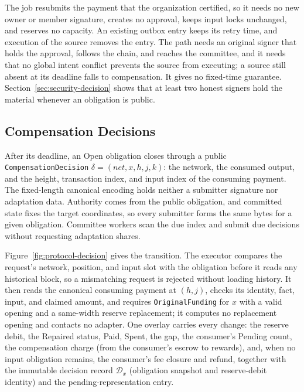 The job resubmits the payment that the organization certified, so it needs no new owner or member signature, creates no approval, keeps input locks unchanged, and reserves no capacity. An existing outbox entry keeps its retry time, and execution of the source removes the entry. The path needs an original signer that holds the approval, follows the chain, and reaches the committee, and it needs that no global intent conflict prevents the source from executing; a source still absent at its deadline falls to compensation. It gives no fixed-time guarantee. Section~\ref{sec:security-decision} shows that at least two honest signers hold the material whenever an obligation is public.

\subsection{Compensation Decisions}
\label{sec:protocol-decision}

After its deadline, an Open obligation closes through a public \texttt{CompensationDecision} $\delta=(\mathit{net},x,h,j,k)$: the network, the consumed output, and the height, transaction index, and input index of the consuming payment. The fixed-length canonical encoding holds neither a submitter signature nor adaptation data. Authority comes from the public obligation, and committed state fixes the target coordinates, so every submitter forms the same bytes for a given obligation. Committee workers scan the due index and submit due decisions without requesting adaptation shares.

Figure~\ref{fig:protocol-decision} gives the transition. The executor compares the request's network, position, and input slot with the obligation before it reads any historical block, so a mismatching request is rejected without loading history. It then reads the canonical consuming payment at $(h,j)$, checks its identity, fact, input, and claimed amount, and requires \texttt{OriginalFunding} for $x$ with a valid opening and a same-width reserve replacement; it computes no replacement opening and contacts no adapter. One overlay carries every change: the reserve debit, the Repaired status, Paid, Spent, the gap, the consumer's Pending count, the compensation charge (from the consumer's escrow to rewards), and, when no input obligation remains, the consumer's fee closure and refund, together with the immutable decision record $\mathcal D_x$ (obligation snapshot and reserve-debit identity) and the pending-representation entry.

